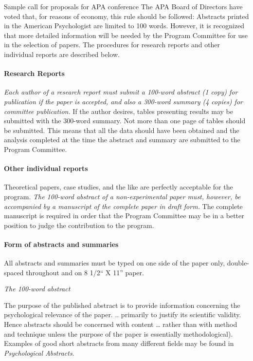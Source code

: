 \begin{refsection}
\begin{apatextbox}{Sample call for proposals for APA conference}
The APA Board of Directors have voted that, for reasons of economy, this rule should be followed: Abstracts printed in the American Psychologist are limited to 100 words. However, it is recognized that more detailed information will be needed by the Program Committee for use in the selection of papers. The procedures for research reports and other individual reports are described below.

\paragraph{Research Reports}
\label{researchreports}

\emph{Each author of a research report must submit a 100-word abstract (1 copy) for publication if the paper is accepted, and also a 300-word summary (4 copies) for committee publication.} If the author desires, tables presenting results may be submitted with the 300-word summary. Not more than one page of tables should be submitted. This means that all the data should have been obtained and the analysis completed at the time the abstract and summary are submitted to the Program Committee.

\paragraph{Other individual reports}
\label{otherindividualreports}

Theoretical papers, case studies, and the like are perfectly acceptable for the program. \emph{The 100-word abstract of a non-experimental paper must, however, be accompanied by a manuscript of the complete paper in draft form.} The complete manuscript is required in order that the Program Committee may be in a better position to judge the contribution to the program.

\paragraph{Form of abstracts and summaries}
\label{formofabstractsandsummaries}

All abstracts and summaries must be typed on one side of the paper only, double-spaced throughout and on 8 1\slash 2`` X 11'' paper.

\emph{The 100-word abstract}

The purpose of the published abstract is to provide information concerning the psychological relevance of the paper. .. primarily to justify its scientific validity. Hence abstracts should be concerned with content {\ldots} rather than with method and technique unless the purpose of the paper is essentially methodological). Examples of good short abstracts from many different fields may be found in \emph{Psychological Abstracts}.


\end{apatextbox}
\end{refsection}
